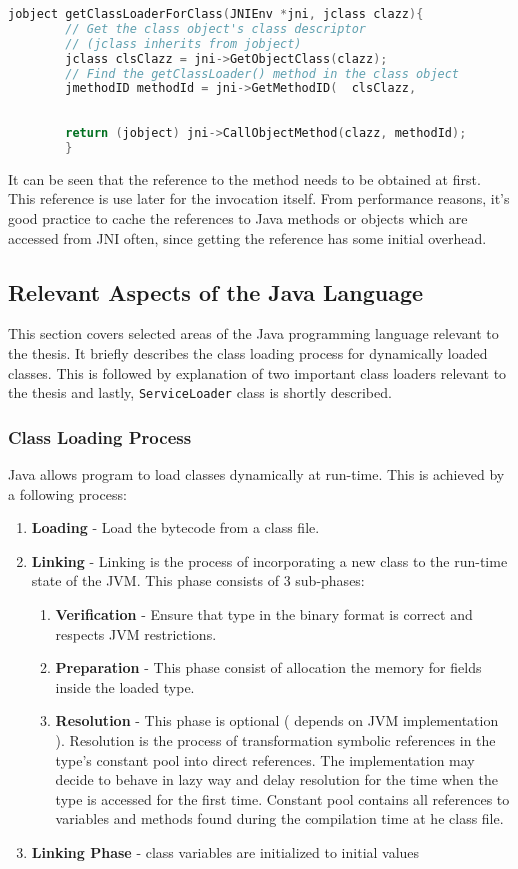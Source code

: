 \begin{lstlisting}[language=c++]
        jobject getClassLoaderForClass(JNIEnv *jni, jclass clazz){
        // Get the class object's class descriptor
        // (jclass inherits from jobject)
        jclass clsClazz = jni->GetObjectClass(clazz);
        // Find the getClassLoader() method in the class object
        jmethodID methodId = jni->GetMethodID(	clsClazz,
																         "getClassLoader",
																         "()Ljava/lang/ClassLoader;");
        return (jobject) jni->CallObjectMethod(clazz, methodId);
        }
\end{lstlisting}

It can be seen that the reference to the method needs to be obtained at first. This reference is use later for the invocation itself. From performance reasons, it's good practice to cache the references to Java methods or objects which are accessed from JNI often, since getting the reference has some initial overhead.

\subsection{Relevant Aspects of the  Java Language}
This section covers selected areas of the Java programming language relevant to the thesis. It briefly describes the class loading process for dynamically loaded classes. This is followed by explanation of two important class loaders relevant to the thesis and lastly, \texttt{ServiceLoader} class is shortly described.
\subsubsection{Class Loading Process}
Java allows program to load classes dynamically at run-time. This is achieved by a following process:
\begin{enumerate}
	\item \textbf{Loading} - Load the bytecode from a class file.
	\item \textbf{Linking} - Linking is the process of incorporating a new class to the run-time state of the JVM. This phase consists of 3 sub-phases:
	\begin{enumerate}
		\item \textbf{Verification} - Ensure that type in the binary format is correct and respects JVM restrictions.
		\item \textbf{Preparation} - This phase consist of allocation the memory for fields inside the loaded type.
		\item \textbf{Resolution} - This phase is optional ( depends on JVM implementation ). Resolution is the process of transformation symbolic references in the type's constant pool into direct references. The implementation may decide to behave in lazy way and delay resolution for the time when the type is accessed for the first time. Constant pool contains all references to variables and methods found during the compilation time at he class file.
	\end{enumerate}
	\item \textbf{Linking Phase} - class variables are initialized to initial values
\end{enumerate}
